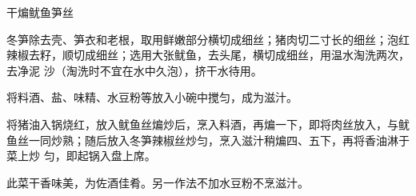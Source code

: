 \begin{recipe}{干煸鱿鱼笋丝}

\ingredients


\preparation

\step 冬笋除去壳、笋衣和老根，取用鲜嫩部分横切成细丝；猪肉切二寸长的细丝；泡红
辣椒去籽，顺切成细丝；选用大张鱿鱼，去头尾，横切成细丝，用温水淘洗两次，去净泥
沙（淘洗时不宜在水中久泡），挤干水待用。

\step 将料酒、盐、味精、水豆粉等放入小碗中搅匀，成为滋汁。

\step 将猪油入锅烧红，放入鱿鱼丝煸炒后，烹入料酒，再煸一下，即将肉丝放入，与鱿
鱼丝一同炒熟；随后放入冬笋辣椒丝炒匀，烹入滋汁稍煸四、五下，再将香油淋于菜上炒
匀，即起锅入盘上席。

\features

此菜干香味美，为佐酒佳肴。另一作法不加水豆粉不烹滋汁。

\end{recipe}

